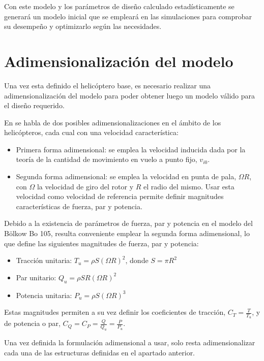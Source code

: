 Con este modelo y los parámetros de diseño calculado estadísticamente se generará un modelo inicial que se empleará en las simulaciones para comprobar su desempeño y optimizarlo según las necesidades.

\section{Adimensionalización del modelo}

Una vez esta definido el helicóptero base, es necesario realizar una adimensionalización del modelo para poder obtener luego un modelo válido para el diseño requerido.

En \citet{Cuerva} se habla de dos posibles adimensionalizaciones en el ámbito de los helicópteros, cada cual con una velocidad característica:

\begin{itemize}
	\item Primera forma adimensional: se emplea la velocidad inducida dada por la teoría de la cantidad de movimiento en vuelo a punto fijo, $v_{i0}$.
	\item Segunda forma adimensional: se emplea la velocidad en punta de pala, $\Omega R$, con $\Omega$ la velocidad de giro del rotor y $R$ el radio del mismo. Usar esta velocidad como velocidad de referencia permite definir magnitudes características de fuerza, par y potencia.
\end{itemize}

Debido a la existencia de parámetros de fuerza, par y potencia en el modelo del Bölkow Bo 105, resulta conveniente emplear la segunda forma adimensional, lo que define las siguientes magnitudes de fuerza, par y potencia:

\begin{itemize}
	\item Tracción unitaria: $T_u=\rho S(\Omega R)^2$, donde $S=\pi R^2$
	\item Par unitario: $Q_u=\rho SR(\Omega R)^2$
	\item Potencia unitaria: $P_u=\rho S(\Omega R)^3$
\end{itemize}

Estas magnitudes permiten a su vez definir los coeficientes de tracción, $C_T=\frac{T}{T_u}$, y de potencia o par, $C_Q=C_P=\frac{Q}{Q_u}=\frac{P}{P_u}$.

Una vez definida la formulación adimensional a usar, solo resta adimensionalizar cada una de las estructuras definidas en el apartado anterior.

